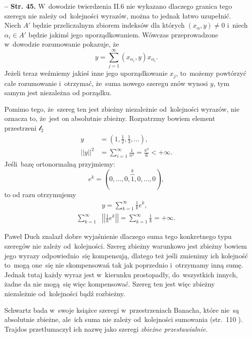 \documentclass[a4paper,11pt]{article}
\newcommand{\ld}{\ldots}
\newcommand{\fr}{\frac}
\newcommand{\tfr}{\tfrac}
\newcommand{\mc}{\mathcal}
\newcommand{\al}{\alpha}
\newcommand{\lc}{\mc{l}}
\newcommand{\Sum}{\sum\limits}
\newcommand{\norm}[1]{\left|\left| #1 \right|\right|}
\newcommand{\tb}{\textbf}
\newcommand{\noi}{\noindent}
\newcommand{\start}{\noi \tb{--} {}}
\newcommand{\Str}[1]{\tb{Str. #1.}}
\begin{document}
\start \Str{45} W~dowodzie twierdzenia II.6 nie wykazano dlaczego
granica tego szeregu nie zależy od~kolejności wyrazów, można to jednak
łatwo uzupełnić. Niech $A'$ będzie przeliczalnym zbiorem indeksów dla
których $( x_{ \al }, y ) \neq 0$ i~niech $\al_{ i } \in A'$ będzie
jakimś jego uporządkowaniem. Wówczas przeprowadzone w~dowodzie
rozumowanie pokazuje, że
\begin{equation}
  y = \Sum_{ j = 1 }^{ \infty } ( x_{ \al_{ i } }, y ) x_{ \al_{ i } }.
\end{equation}
Jeżeli teraz weźmiemy jakieś inne jego uporządkowanie $x_{ j }$,
to~możemy powtórzyć całe rozumowanie i~otrzymać, że~suma nowego
szeregu znów wynosi $y$, tym samym jest niezależna od porządku.

Pomimo tego, że~szereg ten jest zbieżny niezależnie od~kolejności
wyrazów, nie oznacza to, że~jest on absolutnie zbieżny. Rozpatrzmy
bowiem element przestrzeni $\lc_{ 2 }$
\begin{align*}
  y &= ( 1, \tfr{ 1 }{ 2 }, \tfr{ 1 }{ 3 },\ld ), \\
  \norm{ y }^{ 2 } &= \Sum_{ i = 1 }^{ \infty } \fr{ 1 }{ n^{ 2 } }
                     = \fr{ \pi^{ 2 } }{ 6 } < +\infty.
\end{align*}
Jeśli~bazę ortonormalną przyjmiemy:
\begin{equation*}
  e^{ k } = ( 0, \ld, 0, \overbrace{ 1 }^{ k }, 0, \ld, 0),
\end{equation*}
to od razu otrzymujemy
\begin{align*}
  &y = \Sum_{ k = 1 }^{ \infty } \tfr{ 1 }{ k } e^{ k }, \\
  \Sum_{ k = 1 }^{ \infty } &\norm{ \tfr{ 1 }{ k } e^{ k } }
                              = \Sum_{ k = 1 }^{ \infty } \tfr{ 1 }{ k }
                              = +\infty.
\end{align*}

Paweł Duch znalazł dobre wyjaśnienie dlaczego suma tego konkretnego
typu szeregów nie zależy od~kolejności. Szereg zbieżny warunkowo jest
zbieżny bowiem jego wyrazy odpowiednio~się kompensują, dlatego też
jeśli zmienimy ich kolejność to~mogą one~się nie skompensowań tak jak
poprzednio i~otrzymamy inną sumę. Jednak tutaj każdy wyraz jest
w~kierunku prostopadły, %
do~wszystkich innych, żadne da %
nie mogą~się więc kompensować. Szereg ten jest więc zbieżny
niezależnie od~kolejności bądź rozbieżny.

Schwartz bada w~swoje książce szeregi w~przestrzeniach Banacha, które
nie~są absolutnie zbieżne, ale~ich suma nie zależy od~kolejności
sumowania (str.~110 \cite{Sch79}). Trajdos przetłumaczył ich nazwę
jako szeregi \emph{zbieżne przestawialnie}.
\end{document}

